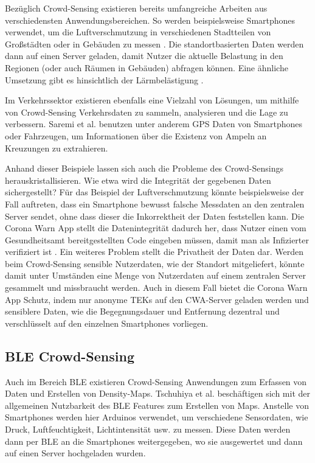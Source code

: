 \documentclass[conference,compsoc]{IEEEtran}
\begin{document}
Bezüglich Crowd-Sensing existieren bereits umfangreiche Arbeiten aus verschiedensten Anwendungsbereichen. 
So werden beispielsweise Smartphones verwendet, um die Luftverschmutzung in verschiedenen Stadtteilen von Großstädten oder in Gebäuden zu messen \cite{AirQuality}. 
Die standortbasierten Daten werden dann auf einen Server geladen, damit Nutzer die aktuelle Belastung in den Regionen (oder auch Räumen in Gebäuden) abfragen können. 
Eine ähnliche Umsetzung gibt es hinsichtlich der Lärmbelästigung \cite{NoiseSense}. 

Im Verkehrssektor existieren ebenfalls eine Vielzahl von Lösungen, um mithilfe von Crowd-Sensing Verkehrsdaten zu sammeln, analysieren und die Lage zu verbessern. 
Saremi et al. \cite{TrafficRegulators} benutzen unter anderem GPS Daten von Smartphones oder Fahrzeugen, um Informationen über die Existenz von Ampeln an Kreuzungen zu extrahieren. 

Anhand dieser Beispiele lassen sich auch die Probleme des Crowd-Sensings herauskristallisieren. 
Wie etwa wird die Integrität der gegebenen Daten sichergestellt?
Für das Beispiel der Luftverschmutzung könnte beispielsweise der Fall auftreten, dass ein Smartphone bewusst falsche Messdaten an den zentralen Server sendet, ohne dass dieser die Inkorrektheit der Daten feststellen kann.
Die Corona Warn App stellt die Datenintegrität dadurch her, dass Nutzer einen vom Gesundheitsamt bereitgestellten Code eingeben müssen, damit man als Infizierter verifiziert ist \cite{CWA}.
Ein weiteres Problem stellt die Privatheit der Daten dar. 
Werden beim Crowd-Sensing sensible Nutzerdaten, wie der Standort mitgeliefert, könnte damit unter Umständen eine Menge von Nutzerdaten auf einem zentralen Server gesammelt und missbraucht werden.
Auch in diesem Fall bietet die Corona Warn App Schutz, indem nur anonyme TEKs auf den CWA-Server geladen werden und sensiblere Daten, wie die Begegnungsdauer und Entfernung dezentral und verschlüsselt auf den einzelnen Smartphones vorliegen.

\subsection{BLE Crowd-Sensing}
Auch im Bereich BLE existieren Crowd-Sensing Anwendungen zum Erfassen von Daten und Erstellen von Density-Maps. 
Tschuhiya et al. \cite{BLESensorDevices} beschäftigen sich mit der allgemeinen Nutzbarkeit des BLE Features zum Erstellen von Maps. 
Anstelle von Smartphones werden hier Arduinos verwendet, um verschiedene Sensordaten, wie Druck, Luftfeuchtigkeit, Lichtintensität usw. zu messen. 
Diese Daten werden dann per BLE an die Smartphones weitergegeben, wo sie ausgewertet und dann auf einen Server hochgeladen wurden. 
\end{document}
